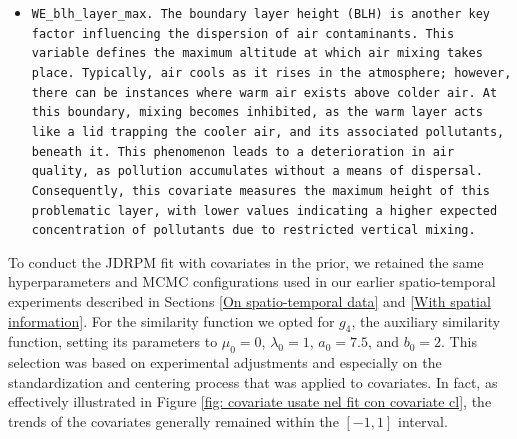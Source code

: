 \documentclass[12pt,	%
	a4paper,		%
	twoside,		%
	openright,		%
	titlepage,%
	]{book}
\theoremstyle{definition}
\begin{document}
\begin{itemize}
    \item \tt{WE\_blh\_layer\_max}. The boundary layer height (BLH) is another key factor influencing the dispersion of air contaminants. This variable defines the maximum altitude at which air mixing takes place. Typically, air cools as it rises in the atmosphere; however, there can be instances where warm air exists above colder air. At this boundary, mixing becomes inhibited, as the warm layer acts like a lid trapping the cooler air, and its associated pollutants, beneath it. This phenomenon leads to a deterioration in air quality, as pollution accumulates without a means of dispersal. Consequently, this covariate measures the maximum height of this problematic layer, with lower values indicating a higher expected concentration of pollutants due to restricted vertical mixing.
\end{itemize}


To conduct the JDRPM fit with covariates in the prior, we retained the same hyperparameters and MCMC configurations used in our earlier spatio-temporal experiments described in Sections \ref{On spatio-temporal data} and \ref{With spatial information}. For the similarity function we opted for $g_4$, the auxiliary similarity function, setting its parameters to $\mu_0 = 0$, $\lambda_0 = 1$, $a_0 = 7.5$, and $b_0 = 2$. This selection was based on experimental adjustments and especially on the standardization and centering process that was applied to covariates. In fact, as effectively illustrated in Figure \ref{fig: covariate usate nel fit con covariate cl}, the trends of the covariates generally remained within the $[-1, 1]$ interval.
\end{document}
